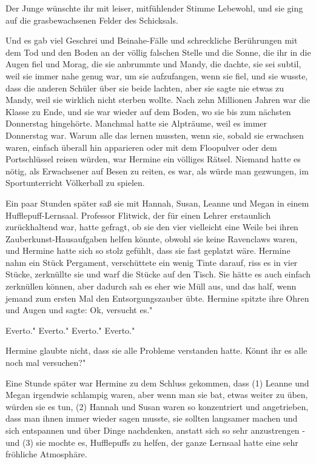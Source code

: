 Der Junge wünschte ihr mit leiser, mitfühlender Stimme Lebewohl, und sie ging
auf die grasbewachsenen Felder des Schicksals.

Und es gab viel Geschrei und Beinahe-Fälle und schreckliche Berührungen mit dem
Tod und den Boden an der völlig falschen Stelle und die Sonne, die ihr in die
Augen fiel und Morag, die sie anbrummte und Mandy, die dachte, sie sei subtil,
weil sie immer nahe genug war, um sie aufzufangen, wenn sie fiel, und sie
wusste, dass die anderen Schüler über sie beide lachten, aber sie sagte nie
etwas zu Mandy, weil sie wirklich nicht sterben wollte. Nach zehn Millionen
Jahren war die Klasse zu Ende, und sie war wieder auf dem Boden, wo sie bis zum
nächsten Donnerstag hingehörte. Manchmal hatte sie Alpträume, weil es immer
Donnerstag war. Warum alle das lernen mussten, wenn sie, sobald sie erwachsen
waren, einfach überall hin apparieren oder mit dem Floopulver oder dem
Portschlüssel reisen würden, war Hermine ein völliges Rätsel. Niemand hatte es
nötig, als Erwachsener auf Besen zu reiten, es war, als würde man gezwungen, im
Sportunterricht Völkerball zu spielen.

Ein paar Stunden später saß sie mit Hannah, Susan, Leanne und Megan in einem
Hufflepuff-Lernsaal. Professor Flitwick, der für einen Lehrer erstaunlich
zurückhaltend war, hatte gefragt, ob sie den vier vielleicht eine Weile bei
ihren Zauberkunst-Hausaufgaben helfen könnte, obwohl sie keine Ravenclaws waren,
und Hermine hatte sich so stolz gefühlt, dass sie fast geplatzt wäre. Hermine
nahm ein Stück Pergament, verschüttete ein wenig Tinte darauf, riss es in vier
Stücke, zerknüllte sie und warf die Stücke auf den Tisch. Sie hätte es auch
einfach zerknüllen können, aber dadurch sah es eher wie Müll aus, und das half,
wenn jemand zum ersten Mal den Entsorgungszauber übte. Hermine spitzte ihre
Ohren und Augen und sagte: \glqq Ok, versucht es."

\glqq Everto." \glqq Everto." \glqq Everto." \glqq Everto."

Hermine glaubte nicht, dass sie alle Probleme verstanden hatte. \glqq Könnt ihr
es alle noch mal versuchen?"

Eine Stunde später war Hermine zu dem Schluss gekommen, dass (1) Leanne und
Megan irgendwie schlampig waren, aber wenn man sie bat, etwas weiter zu üben,
würden sie es tun, (2) Hannah und Susan waren so konzentriert und angetrieben,
dass man ihnen immer wieder sagen musste, sie sollten langsamer machen und sich
entspannen und über Dinge nachdenken, anstatt sich so sehr anzustrengen - und
(3) sie mochte es, Hufflepuffs zu helfen, der ganze Lernsaal hatte eine sehr
fröhliche Atmosphäre.

